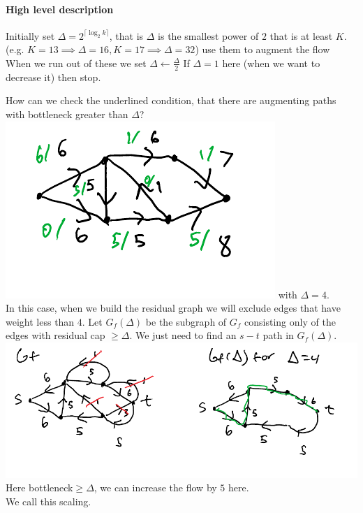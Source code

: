 \documentclass[12 pt]{article}
\begin{document}
        \paragraph{High level description}
        \begin{algorithmic}
          \State Initially set $\Delta = 2^{\lceil \log_2 k \rceil}$,
          that is $\Delta$ is the smallest power of $2$ that is at
          least $K$. (e.g. $K=13 \implies \Delta = 16, K=17 \implies
          \Delta = 32$)
           use them to augment the flow
          \State When we run out of these we set $\Delta \gets
          \frac{\Delta}{2}$
          \State If $\Delta=1$ here (when we want to decrease it) then stop.
          \EndWhile
        \end{algorithmic}
        How can we check the underlined condition, that there are
        augmenting paths with bottleneck greater than $\Delta$?
        \\ \includegraphics[width=.9\textwidth]{i38.pdf} with
        $\Delta=4$.
        \\In this case, when we build the residual graph we will
        exclude edges that have weight less than $4$. Let
        $G_f(\Delta)$ be the subgraph of $G_f$ consisting only of the
        edges with residual cap $\geq \Delta$. We just need to find an
        $s-t$ path in $G_f(\Delta)$.
        \\ \includegraphics[width=.9\textwidth]{i39.pdf}
        \\ Here bottleneck$\geq \Delta$, we can increase the flow by
        $5$ here.
        \\ We call this scaling.
\end{document}
